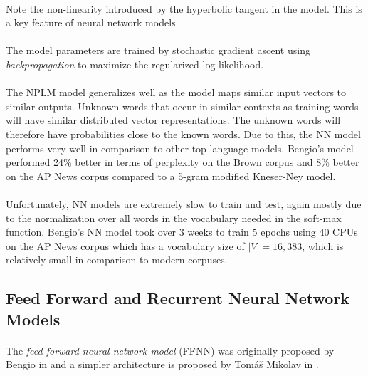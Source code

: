 \documentclass[12pt]{ociamthesis}
\begin{document}
\paragraph{}
Note the non-linearity introduced by the hyperbolic tangent in the model. This is a key feature of neural network models.
\paragraph{}
The model parameters are trained by stochastic gradient ascent using \emph{backpropagation} to maximize the regularized log likelihood. 
\paragraph{}
The NPLM model generalizes well as the model maps similar input vectors to similar outputs. Unknown words that occur in similar contexts as training words will have similar distributed vector representations. The unknown words will therefore have probabilities close to the known words.  Due to this, the NN model performs very well in comparison to other top language models. Bengio's model performed 24\% better in terms of perplexity on the Brown corpus and 8\% better on the AP News corpus compared to a 5-gram modified Kneser-Ney model.
\paragraph{}
Unfortunately, NN models are extremely slow to train and test, again mostly due to the normalization over all words in the vocabulary needed in the soft-max function. Bengio's NN model took over 3 weeks to train 5 epochs using 40 CPUs on the AP News corpus which has a vocabulary size of $|V|=16,383$, which is relatively small in comparison to modern corpuses.

\subsection{Feed Forward and Recurrent Neural Network Models}
\paragraph{}
The \emph{feed forward neural network model} (FFNN) was originally proposed by Bengio in \cite{Bengio2003} and  a simpler architecture is proposed by Tom{\'a}\v{s} Mikolav in \cite{Mikolov2009}.
\end{document}
